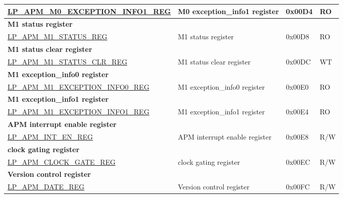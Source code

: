 \begin{longtable}{ | p{6cm} | p{6.2cm} | p{2.2cm} | p{1cm} | }
\hyperref[regdesc:LPAPMM0EXCEPTIONINFO1REG]{LP\_APM\_M0\_EXCEPTION\_INFO1\_REG} & M0 exception\_info1 register & 0x00D4 & RO \\ \hline
\multicolumn{4}{|l|}{\textbf{M1 status register}} \\ \hline
\hyperref[regdesc:LPAPMM1STATUSREG]{LP\_APM\_M1\_STATUS\_REG} & M1 status register & 0x00D8 & RO \\ \hline
\multicolumn{4}{|l|}{\textbf{M1 status clear register}} \\ \hline
\hyperref[regdesc:LPAPMM1STATUSCLRREG]{LP\_APM\_M1\_STATUS\_CLR\_REG} & M1 status clear register & 0x00DC & WT \\ \hline
\multicolumn{4}{|l|}{\textbf{M1 exception\_info0 register}} \\ \hline
\hyperref[regdesc:LPAPMM1EXCEPTIONINFO0REG]{LP\_APM\_M1\_EXCEPTION\_INFO0\_REG} & M1 exception\_info0 register & 0x00E0 & RO \\ \hline
\multicolumn{4}{|l|}{\textbf{M1 exception\_info1 register}} \\ \hline
\hyperref[regdesc:LPAPMM1EXCEPTIONINFO1REG]{LP\_APM\_M1\_EXCEPTION\_INFO1\_REG} & M1 exception\_info1 register & 0x00E4 & RO \\ \hline
\multicolumn{4}{|l|}{\textbf{APM interrupt enable register}} \\ \hline
\hyperref[regdesc:LPAPMINTENREG]{LP\_APM\_INT\_EN\_REG} & APM interrupt enable register & 0x00E8 & R/W \\ \hline
\multicolumn{4}{|l|}{\textbf{clock gating register}} \\ \hline
\hyperref[regdesc:LPAPMCLOCKGATEREG]{LP\_APM\_CLOCK\_GATE\_REG} & clock gating register & 0x00EC & R/W \\ \hline
\multicolumn{4}{|l|}{\textbf{Version control register}} \\ \hline
\hyperref[regdesc:LPAPMDATEREG]{LP\_APM\_DATE\_REG} & Version control register & 0x00FC & R/W \\ \hline
\end{longtable}
